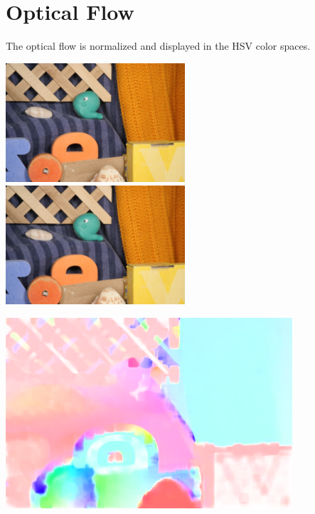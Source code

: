 \documentclass[a4paper]{scrartcl}
\begin{document}
\section{Optical Flow}

The optical flow is normalized and displayed in the HSV color spaces.

\vspace{1cm}
\begin{minipage}{0.8\textwidth}
  \includegraphics[width=0.5\textwidth]{../lab_4_optical_flow/frame10.png}
  \includegraphics[width=0.5\textwidth]{../lab_4_optical_flow/frame11.png}
\end{minipage}

\vspace{1cm}
\begin{minipage}{0.8\textwidth}
  \centering
    \includegraphics[width=0.8\textwidth]{optical_flow.png}
\end{minipage}
\end{document}
